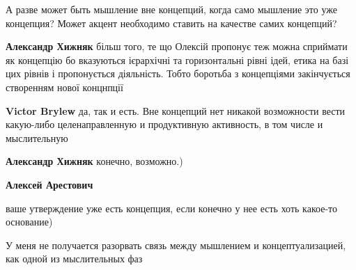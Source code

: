 \begin{itemize}
 

А разве может быть мышление вне концепций, когда само мышление это уже
концепция? Может акцент необходимо ставить на качестве самих концепций?

\begin{itemize}
 
\textbf{Александр Хижняк} більш того, те що Олексій пропонує теж можна
сприймати як концепцію бо вказуються ієрархічні та горизонтальні рівні ідей,
етика на базі цих рівнів і пропонується діяльність. Тобто боротьба з
концепціями закінчується створенням нової концнпції


 
\textbf{Victor Brylew} да, так и есть. Вне концепций нет никакой возможности
вести какую-либо целенаправленную и продуктивную активность, в том числе и
мыслительную


 
\textbf{Александр Хижняк} конечно, возможно.)

 
\textbf{Алексей Арестович} 

ваше утверждение уже есть концепция, если конечно у нее есть хоть какое-то
основание)

У меня не получается разорвать связь между мышлением и концептуализацией, как
одной из мыслительных фаз



\end{itemize}
\end{itemize}
